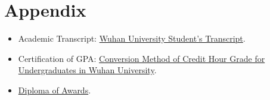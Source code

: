 \documentclass[letterpaper]{twentysecondcv} %
\begin{document}

\vspace{100pt}
\profilesection{}

\section{Appendix}


\begin{itemize}
	\setlength{\itemsep}{0pt}
	\setlength{\parsep}{0pt}
	\setlength{\parskip}{0pt}
	\item Academic Transcript: \href{https://raw.githubusercontent.com/RMSnow/CV/master/materials/AcademicTranscript.jpg}
	{Wuhan University Student's Transcript}.
	\item Certification of GPA: \href{https://raw.githubusercontent.com/RMSnow/CV/master/materials/GPA.jpg}
	{Conversion Method of Credit Hour Grade for Undergraduates in Wuhan University}.
	\item \href{https://github.com/RMSnow/CV/blob/master/materials/XueyaoZhang_Awards.pdf}
	{Diploma of Awards}.
\end{itemize}






\end{document}
